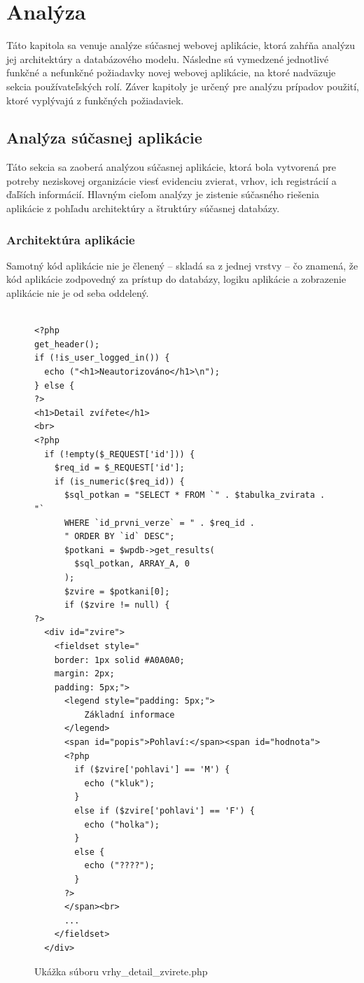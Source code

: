 \chapter{Analýza}
Táto kapitola sa venuje analýze súčasnej webovej aplikácie, ktorá zahŕňa analýzu jej architektúry a databázového modelu. Následne sú vymedzené jednotlivé funkčné a nefunkčné požiadavky novej webovej aplikácie, na ktoré nadväzuje sekcia používateľských rolí. Záver kapitoly je určený pre analýzu prípadov použití, ktoré vyplývajú z funkčných požiadaviek.

\section{Analýza súčasnej aplikácie}
Táto sekcia sa zaoberá analýzou súčasnej aplikácie, ktorá bola vytvorená pre potreby neziskovej organizácie viesť evidenciu zvierat, vrhov, ich registrácií a ďaľších informácií.
Hlavným cieľom analýzy je zistenie súčasného riešenia aplikácie z pohľadu architektúry a štruktúry súčasnej databázy.

\subsection{Architektúra aplikácie}
Samotný kód aplikácie nie je členený -- skladá sa z jednej vrstvy -- čo znamená, že kód aplikácie zodpovedný za prístup do databázy, logiku aplikácie a zobrazenie aplikácie nie je od seba oddelený.

\begin{figure}[H]
\begin{minipage}[]{\linewidth}
\begin{verbatim}

<?php
get_header();
if (!is_user_logged_in()) { 
  echo ("<h1>Neautorizováno</h1>\n");
} else {
?>
<h1>Detail zvířete</h1>
<br>
<?php
  if (!empty($_REQUEST['id'])) {
    $req_id = $_REQUEST['id'];
    if (is_numeric($req_id)) {
      $sql_potkan = "SELECT * FROM `" . $tabulka_zvirata . "`
      WHERE `id_prvni_verze` = " . $req_id .
      " ORDER BY `id` DESC";
      $potkani = $wpdb->get_results(
      	$sql_potkan, ARRAY_A, 0
      );
      $zvire = $potkani[0];
      if ($zvire != null) {
?>
  <div id="zvire">
    <fieldset style="
    border: 1px solid #A0A0A0;
    margin: 2px;
    padding: 5px;">
      <legend style="padding: 5px;">
          Základní informace
      </legend>
      <span id="popis">Pohlaví:</span><span id="hodnota">
      <?php 
        if ($zvire['pohlavi'] == 'M') {
          echo ("kluk"); 
        }
        else if ($zvire['pohlavi'] == 'F') {
          echo ("holka"); 
        }
        else {
          echo ("????"); 
        }
      ?>
      </span><br>
      ...
    </fieldset>
  </div>
\end{verbatim}
\end{minipage}

\caption[Ukážka súboru vrhy\_detail\_zvirete.php]
{Ukážka súboru vrhy\_detail\_zvirete.php}
\label{current-code-example}
\end{figure}

